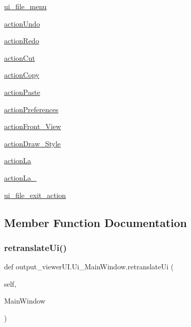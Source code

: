 \begin{DoxyCompactItemize}
\hyperlink{a00098_abf378391cb97c7daa1dcc7458ae26d29}{ui\+\_\+file\+\_\+menu}
\item 
\hyperlink{a00098_a885e2a1ee5a96a1e7c1a336ecdd02518}{action\+Undo}
\item 
\hyperlink{a00098_a732cf29558af5ac0db109050e93d03a0}{action\+Redo}
\item 
\hyperlink{a00098_a20b08adb5b2b3e4f97465cfbdd5c4d27}{action\+Cut}
\item 
\hyperlink{a00098_a591e47cae22ade3a6bd2a57754db9141}{action\+Copy}
\item 
\hyperlink{a00098_a0605f6f6261e3019d29e471b368398ed}{action\+Paste}
\item 
\hyperlink{a00098_a80387a6115341ac316c2582ffefd7ab1}{action\+Preferences}
\item 
\hyperlink{a00098_a808772e632be99f7d84eccedca596604}{action\+Front\+\_\+\+View}
\item 
\hyperlink{a00098_aa11ed317a9625aff4fd5a794dc570520}{action\+Draw\+\_\+\+Style}
\item 
\hyperlink{a00098_aa992117bc609f60f393c8fff5b5dc89f}{action\+La}
\item 
\hyperlink{a00098_a0e5b34f7aad679ffb90131f69372304a}{action\+La\+\_}
\item 
\hyperlink{a00098_a825bab69ddd68d04989a3f919debb14f}{ui\+\_\+file\+\_\+exit\+\_\+action}
\end{DoxyCompactItemize}


\subsection{Member Function Documentation}
\hypertarget{a00098_a96efd9219a406e801e268b7add32cb78}{}\label{a00098_a96efd9219a406e801e268b7add32cb78} 
\subsubsection{\texorpdfstring{retranslate\+Ui()}{retranslateUi()}}
{\footnotesize\ttfamily def output\+\_\+viewer\+U\+I.\+Ui\+\_\+\+Main\+Window.\+retranslate\+Ui (\begin{DoxyParamCaption}\item[{}]{self,  }\item[{}]{Main\+Window }\end{DoxyParamCaption})}

